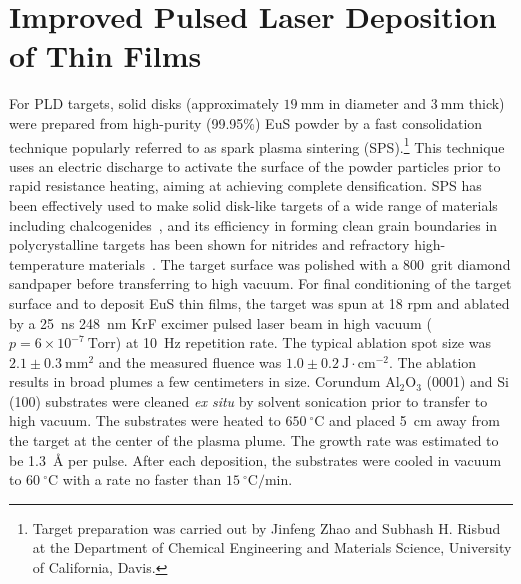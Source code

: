 \section{Improved Pulsed Laser Deposition of Thin Films}\label{sec:EuSPLD}
For PLD targets, solid disks (approximately $19~\mathrm{mm}$ in diameter and $3~\mathrm{mm}$ thick) were prepared from high-purity (99.95\%) EuS powder by a fast consolidation technique popularly referred to as spark plasma sintering (SPS).\footnote{Target preparation was carried out by Jinfeng Zhao and Subhash H. Risbud at the Department of Chemical Engineering and Materials Science, University of California, Davis.} This technique uses an electric discharge to activate the surface of the powder particles prior to rapid resistance heating, aiming at achieving complete densification. SPS has been effectively used to make solid disk-like targets of a wide range of materials including chalcogenides~\cite{Jinfeng2, Subhash1}, and its efficiency in forming clean grain boundaries in polycrystalline targets has been shown for nitrides and refractory high-temperature materials~\cite{Subhash2, Jinfeng1}. The target surface was polished with a 800~grit diamond sandpaper before transferring to high vacuum. For final conditioning of the target surface and to deposit EuS thin films, the target was spun at 18 rpm and ablated by a 25~ns 248~nm KrF excimer pulsed laser beam in high vacuum ($p=6\times{}10^{-7}~\mathrm{Torr}$) at 10~Hz repetition rate. The typical ablation spot size was $2.1\pm0.3~\mathrm{mm^2}$ and the measured fluence was $1.0\pm0.2~\mathrm{J\cdot{}cm^{-2}}$. The ablation results in broad plumes a few centimeters in size. Corundum Al$_2$O$_3$ (0001) and Si (100) substrates were cleaned \textit{ex situ} by solvent sonication prior to transfer to high vacuum. The substrates were heated to $650~^{\circ}\mathrm{C}$ and placed 5~cm away from the target at the center of the plasma plume. The growth rate was estimated to be 1.3~\AA{} per pulse. After each deposition, the substrates were cooled in vacuum to $60~^{\circ}\mathrm{C}$ with a rate no faster than $15~^{\circ}\mathrm{C}/\mathrm{min}$.

